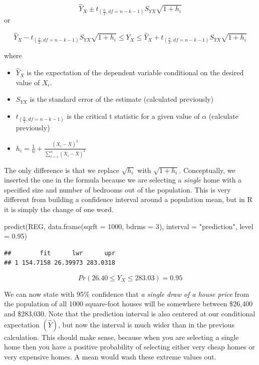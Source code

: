 \documentclass[
]{book}
\newenvironment{Shaded}{\begin{snugshade}}{\end{snugshade}}
\newcommand{\AttributeTok}[1]{\textcolor[rgb]{0.77,0.63,0.00}{#1}}
\newcommand{\DecValTok}[1]{\textcolor[rgb]{0.00,0.00,0.81}{#1}}
\newcommand{\FloatTok}[1]{\textcolor[rgb]{0.00,0.00,0.81}{#1}}
\newcommand{\FunctionTok}[1]{\textcolor[rgb]{0.00,0.00,0.00}{#1}}
\newcommand{\NormalTok}[1]{#1}
\newcommand{\StringTok}[1]{\textcolor[rgb]{0.31,0.60,0.02}{#1}}
\begin{document}
\[ \hat{Y}_{X} \pm t_{(\frac{\alpha}{2},df=n-k-1)}S_{YX} \sqrt{1+h_i}\]
or

\[ \hat{Y}_{X} - t_{(\frac{\alpha}{2},df=n-k-1)}S_{YX} \sqrt{1+h_i} \leq Y_{X} \leq \hat{Y}_{X} + t_{(\frac{\alpha}{2},df=n-k-1)}S_{YX} \sqrt{1+h_i}\]

where

\begin{itemize}
\item
  \(\hat{Y}_{X}\) is the expectation of the dependent variable conditional on the desired value of \(X_i\).
\item
  \(S_{YX}\) is the standard error of the estimate (calculated previously)
\item
  \(t_{(\frac{\alpha}{2},df=n-k-1)}\) is the critical t statistic for a given value of \(\alpha\) (calculate previously)
\item
  \(h_i = \frac{1}{n}+\frac{(X_i - \bar{X})^2}{\sum_{i=1}^n(X_i - \bar{X})^2}\)
\end{itemize}

The only difference is that we replace \(\sqrt{h_i}\) with \(\sqrt{1+h_i}\). Conceptually, we inserted the one in the formula because we are selecting a \emph{single} home with a specified size and number of bedrooms out of the population. This is very different from building a confidence interval around a population mean, but in R it is simply the change of one word.

\begin{Shaded}
\begin{Highlighting}[]
\FunctionTok{predict}\NormalTok{(REG,}
        \FunctionTok{data.frame}\NormalTok{(}\AttributeTok{sqrft =} \DecValTok{1000}\NormalTok{, }\AttributeTok{bdrms =} \DecValTok{3}\NormalTok{), }
        \AttributeTok{interval =} \StringTok{"prediction"}\NormalTok{,}
        \AttributeTok{level =} \FloatTok{0.95}\NormalTok{)}
\end{Highlighting}
\end{Shaded}

\begin{verbatim}
##        fit      lwr      upr
## 1 154.7158 26.39973 283.0318
\end{verbatim}

\[Pr(26.40\leq Y_{X} \leq 283.03)=0.95\]

We can now state with 95\% confidence that \emph{a single draw of a house price} from the population of all 1000 square-foot houses will be somewhere between \$26,400 and \$283,030. Note that the prediction interval is also centered at our conditional expectation \((\hat{Y})\), but now the interval is much wider than in the previous calculation. This should make sense, because when you are selecting a single home then you have a positive probability of selecting either very cheap homes or very expensive homes. A mean would wash these extreme values out.
\end{document}
